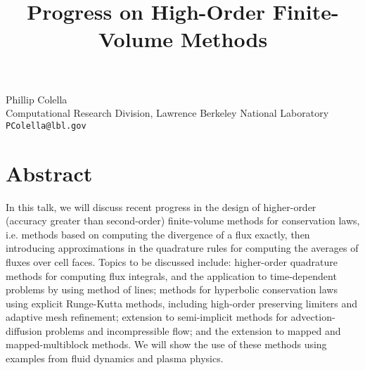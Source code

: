 \title{Progress on High-Order Finite-Volume Methods}
\author{} \institute{}
\maketitle

\begin{center}
{\large Phillip Colella}\\
Computational Research Division, Lawrence Berkeley National Laboratory \\
{\tt PColella@lbl.gov}
\end{center}

\section*{Abstract}
In this talk, we will discuss recent progress in the design of higher-order (accuracy greater than second-order) finite-volume methods for conservation laws, i.e.  methods based on computing the divergence of a flux exactly, then introducing approximations in the quadrature rules for computing the averages of fluxes over cell faces. Topics to be discussed include: higher-order quadrature methods for computing flux integrals, and the application to time-dependent problems by using method of lines; methods for hyperbolic conservation laws using explicit Runge-Kutta methods, including high-order preserving limiters and adaptive mesh refinement; extension to semi-implicit methods for advection-diffusion problems and incompressible flow; and the extension to mapped and mapped-multiblock methods. We will show the use of these methods using examples from fluid dynamics and plasma physics.

